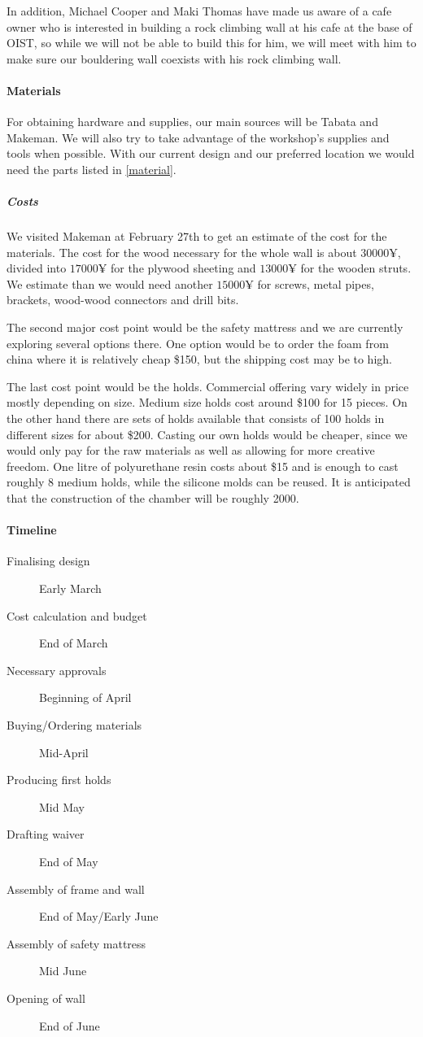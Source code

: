 \documentclass[a4paper, 12pt]{scrreprt}
\begin{document}
In addition, Michael Cooper and Maki Thomas have made us aware of a cafe owner who is interested in building a rock climbing wall at his cafe at the base of OIST, so while we will not be able to build this for him, we will meet with him to make sure our bouldering wall coexists with his rock climbing wall.

\paragraph{Materials}
For obtaining hardware and supplies, our main sources will be Tabata and Makeman. We will also try to take advantage of the workshop's supplies and tools when possible. With our current design and our preferred location we would need the parts listed in \cref{material}.

\subparagraph{Costs}
We visited Makeman at February 27th to get an estimate of the cost for the materials. The cost for the wood necessary for the whole wall is about $30000\yen$, divided into $17000\yen$ for the plywood sheeting and $13000\yen$ for the wooden struts. We estimate than we would need another $15000\yen$ for screws, metal pipes, brackets, wood-wood connectors and drill bits.

The second major cost point would be the safety mattress and we are currently exploring several options there. One option would be to order the foam from china where it is relatively cheap \$150, but the shipping cost may be to high. 

The last cost point would be the holds. Commercial offering vary widely in price mostly depending on size. Medium size holds cost around \$100 for 15 pieces. On the other hand there are sets of holds available that consists of 100 holds in different sizes for about \$200. Casting our own holds would be cheaper, since we would only pay for the raw materials as well as allowing for more creative freedom. One litre of polyurethane resin costs about \$15 and is enough to cast roughly 8 medium holds, while the silicone molds can be reused. It is anticipated that the construction of the chamber will be roughly 2000\yen. 

\paragraph{Timeline}
\begin{description}
  \item[Finalising design] Early March
  \item[Cost calculation and budget] End of March
  \item[Necessary approvals] Beginning of April
  \item[Buying/Ordering materials] Mid-April
  \item[Producing first holds] Mid May
  \item[Drafting waiver] End of May
  \item[Assembly of frame and wall] End of May/Early June
  \item[Assembly of safety mattress] Mid June
  \item[Opening of wall] End of June
\end{description}
\end{document}
